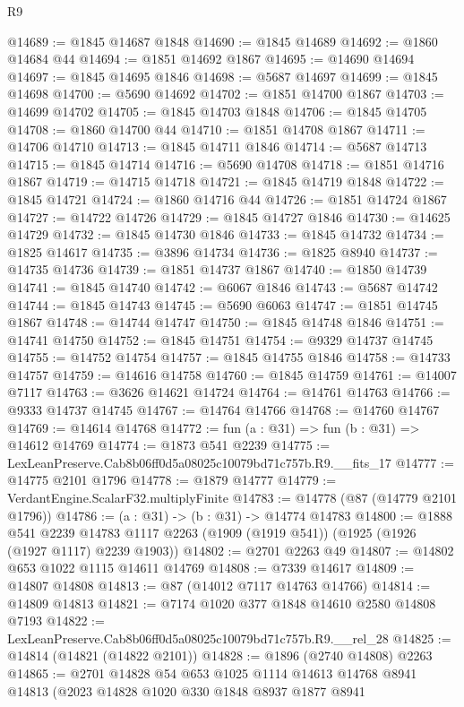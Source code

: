 \begin{lexlean}{R9}
\begin{coremodule}
@14689 := @1845 @14687 @1848
@14690 := @1845 @14689
@14692 := @1860 @14684 @44
@14694 := @1851 @14692 @1867
@14695 := @14690 @14694
@14697 := @1845 @14695 @1846
@14698 := @5687 @14697
@14699 := @1845 @14698
@14700 := @5690 @14692
@14702 := @1851 @14700 @1867
@14703 := @14699 @14702
@14705 := @1845 @14703 @1848
@14706 := @1845 @14705
@14708 := @1860 @14700 @44
@14710 := @1851 @14708 @1867
@14711 := @14706 @14710
@14713 := @1845 @14711 @1846
@14714 := @5687 @14713
@14715 := @1845 @14714
@14716 := @5690 @14708
@14718 := @1851 @14716 @1867
@14719 := @14715 @14718
@14721 := @1845 @14719 @1848
@14722 := @1845 @14721
@14724 := @1860 @14716 @44
@14726 := @1851 @14724 @1867
@14727 := @14722 @14726
@14729 := @1845 @14727 @1846
@14730 := @14625 @14729
@14732 := @1845 @14730 @1846
@14733 := @1845 @14732
@14734 := @1825 @14617
@14735 := @3896 @14734
@14736 := @1825 @8940
@14737 := @14735 @14736
@14739 := @1851 @14737 @1867
@14740 := @1850 @14739
@14741 := @1845 @14740
@14742 := @6067 @1846
@14743 := @5687 @14742
@14744 := @1845 @14743
@14745 := @5690 @6063
@14747 := @1851 @14745 @1867
@14748 := @14744 @14747
@14750 := @1845 @14748 @1846
@14751 := @14741 @14750
@14752 := @1845 @14751
@14754 := @9329 @14737 @14745
@14755 := @14752 @14754
@14757 := @1845 @14755 @1846
@14758 := @14733 @14757
@14759 := @14616 @14758
@14760 := @1845 @14759
@14761 := @14007 @7117
@14763 := @3626 @14621 @14724
@14764 := @14761 @14763
@14766 := @9333 @14737 @14745
@14767 := @14764 @14766
@14768 := @14760 @14767
@14769 := @14614 @14768
@14772 := fun (a : @31) => fun (b : @31) => @14612 @14769
@14774 := @1873 @541 @2239
@14775 := LexLeanPreserve.Cab8b06ff0d5a08025c10079bd71c757b.R9.__fits_17
@14777 := @14775 @2101 @1796
@14778 := @1879 @14777
@14779 := VerdantEngine.ScalarF32.multiplyFinite
@14783 := @14778 (@87 (@14779 @2101 @1796))
@14786 := (a : @31) -> (b : @31) -> @14774 @14783
@14800 := @1888
    @541
    @2239
    @14783
    @1117
    @2263
    (@1909 (@1919 @541))
    (@1925 (@1926 (@1927 @1117) @2239 @1903))
@14802 := @2701 @2263 @49
@14807 := @14802 @653 @1022 @1115 @14611 @14769
@14808 := @7339 @14617
@14809 := @14807 @14808
@14813 := @87 (@14012 @7117 @14763 @14766)
@14814 := @14809 @14813
@14821 := @7174 @1020 @377 @1848 @14610 @2580 @14808 @7193
@14822 := LexLeanPreserve.Cab8b06ff0d5a08025c10079bd71c757b.R9.__rel_28
@14825 := @14814 (@14821 (@14822 @2101))
@14828 := @1896 (@2740 @14808) @2263
@14865 := @2701
    @14828
    @54
    @653
    @1025
    @1114
    @14613
    @14768
    @8941
    @14813
    (@2023
      @14828
      @1020
      @330
      @1848
      @8937
      @1877
      @8941

\end{coremodule}
\end{lexlean}

